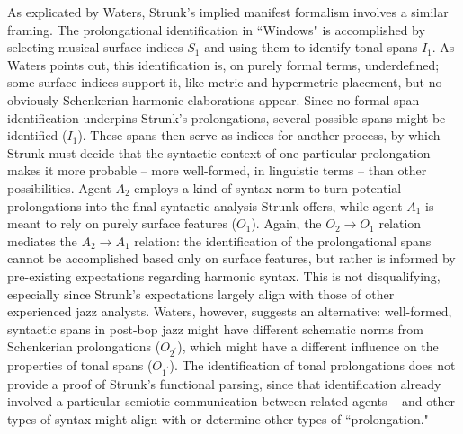 As explicated by Waters, Strunk's implied manifest formalism involves a similar framing.  The prolongational identification in ``Windows" is accomplished by selecting musical surface indices $S_1$ and using them to identify tonal spans $I_1$.  As Waters points out, this identification is, on purely formal terms, underdefined; some surface indices support it, like metric and hypermetric placement, but no obviously Schenkerian harmonic elaborations appear. Since no formal span-identification underpins Strunk's prolongations, several possible spans might be identified ($I_1$).  These spans then serve as indices for another process, by which Strunk must decide that the syntactic context of one particular prolongation makes it more probable -- more well-formed, in linguistic terms -- than other possibilities.  Agent $A_2$ employs a kind of syntax norm to turn potential prolongations into the final syntactic analysis Strunk offers, while agent $A_1$ is meant to rely on purely surface features ($O_1$).  Again, the $O_2 \rightarrow O_1$ relation mediates the $A_2 \rightarrow A_1$ relation: the identification of the prolongational spans cannot be accomplished based only on surface features, but rather is informed by pre-existing expectations regarding harmonic syntax.  This is not disqualifying, especially since Strunk's expectations largely align with those of other experienced jazz analysts.  Waters, however, suggests an alternative: well-formed, syntactic spans in post-bop jazz might have different schematic norms from Schenkerian prolongations ($O_{2^{\prime}}$), which might have a different influence on the properties of tonal spans ($O_{1^{\prime}}$).  The identification of tonal prolongations does not provide a proof of Strunk's functional parsing, since that identification already involved a particular semiotic communication between related agents -- and other types of syntax might align with or determine other types of ``prolongation."

